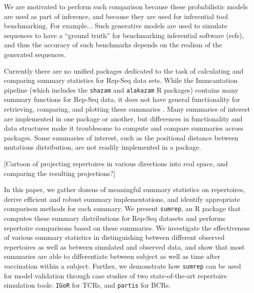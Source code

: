 \documentclass{article}
\begin{document}
We are motivated to perform such comparison because these probabilistic models are used as part of inference, and because they are used for inferential tool benchmarking.
For example...
Such generative models are used to simulate sequences to have a ``ground truth'' for benchmarking inferential software (refs), and thus the accuracy of such benchmarks depends on the realism of the generated sequences.

Currently there are no unified packages dedicated to the task of calculating and comparing summary statistics for Rep-Seq data sets.
While the Immcantation pipeline (which includes the \texttt{shazam} and \texttt{alakazam} R packages) contains many summary functions for Rep-Seq data, it does not have general functionality for retrieving, comparing, and plotting these summaries \cite{Gupta2015-iu}.
Many summaries of interest are implemented in one package or another, but differences in functionality and data structures make it troublesome to compute and compare summaries across packages.
Some summaries of interest, such as the positional distance between mutations distribution, are not readily implemented in a package.

[Cartoon of projecting repertoires in various directions into real space, and comparing the resulting projections?]

In this paper, we gather dozens of meaningful summary statistics on repertoires, derive efficient and robust summary implementations, and identify appropriate comparison methods for each summary.
We present \texttt{sumrep}, an R package that computes these summary distributions for Rep-Seq datasets and performs repertoire comparisons based on these summaries.
We investigate the effectiveness of various summary statistics in distinguishing between different observed repertoires as well as between simulated and observed data, and show that most summaries are able to differentiate between subject as well as time after vaccination within a subject.
Further, we demonstrate how \texttt{sumrep} can be used for model validation through case studies of two state-of-the-art repertoire simulation tools: \texttt{IGoR} \cite{Marcou2018-du} for TCRs, and \texttt{partis} \cite{Ralph2016-nw, Ralph2016-iz} for BCRs.
\end{document}
